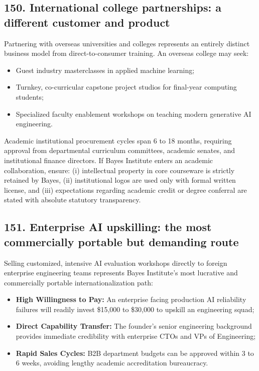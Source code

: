 \subsection{150. International college partnerships: a different customer and product}

Partnering with overseas universities and colleges represents an entirely distinct business model from direct-to-consumer training. An overseas college may seek:
\begin{itemize}
    \item Guest industry masterclasses in applied machine learning;
    \item Turnkey, co-curricular capstone project studios for final-year computing students;
    \item Specialized faculty enablement workshops on teaching modern generative AI engineering.
\end{itemize}

Academic institutional procurement cycles span 6 to 18 months, requiring approval from departmental curriculum committees, academic senates, and institutional finance directors. If Bayes Institute enters an academic collaboration, ensure: (i) intellectual property in core courseware is strictly retained by Bayes, (ii) institutional logos are used only with formal written license, and (iii) expectations regarding academic credit or degree conferral are stated with absolute statutory transparency.

\subsection{151. Enterprise AI upskilling: the most commercially portable but demanding route}

Selling customized, intensive AI evaluation workshops directly to foreign enterprise engineering teams represents Bayes Institute's most lucrative and commercially portable internationalization path:
\begin{itemize}
    \item \textbf{High Willingness to Pay:} An enterprise facing production AI reliability failures will readily invest \$15,000 to \$30,000 to upskill an engineering squad;
    \item \textbf{Direct Capability Transfer:} The founder's senior engineering background provides immediate credibility with enterprise CTOs and VPs of Engineering;
    \item \textbf{Rapid Sales Cycles:} B2B department budgets can be approved within 3 to 6 weeks, avoiding lengthy academic accreditation bureaucracy.
\end{itemize}

